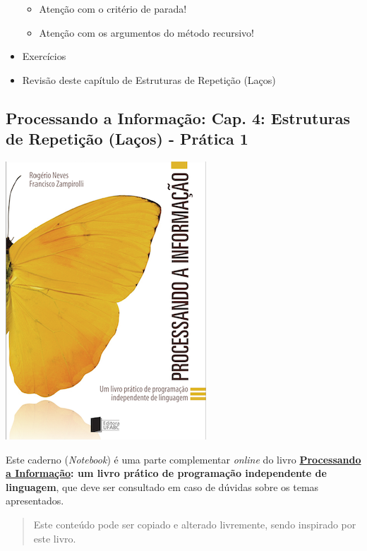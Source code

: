 \documentclass[12pt,a4paper]{article}
\providecommand{\tightlist}{%
      \setlength{\itemsep}{0pt}\setlength{\parskip}{0pt}}
\begin{document}
\begin{itemize}
  \begin{itemize}
  \tightlist
  \item
    Atenção com o critério de parada!
  \item
    Atenção com os argumentos do método recursivo!
  \end{itemize}
\item
  Exercícios
\item
  Revisão deste capítulo de Estruturas de Repetição (Laços)
\end{itemize}

    \hypertarget{processando-a-informauxe7uxe3o-cap.-4-estruturas-de-repetiuxe7uxe3o-lauxe7os---pruxe1tica-1}{%
\subsection{Processando a Informação: Cap. 4: Estruturas de Repetição
(Laços) - Prática
1}\label{processando-a-informauxe7uxe3o-cap.-4-estruturas-de-repetiuxe7uxe3o-lauxe7os---pruxe1tica-1}}

    \includegraphics{"figs/Capa_Processando_Informacao.jpg"}

Este caderno (\emph{Notebook}) é uma parte complementar \emph{online} do
livro
\textbf{\href{https://editora.ufabc.edu.br/matematica-e-ciencias-da-computacao/58-processando-a-informacao}{Processando
a Informação}: um livro prático de programação independente de
linguagem}, que deve ser consultado em caso de dúvidas sobre os temas
apresentados.

\begin{quote}
Este conteúdo pode ser copiado e alterado livremente, sendo inspirado
por este livro.
\end{quote}
\end{document}
